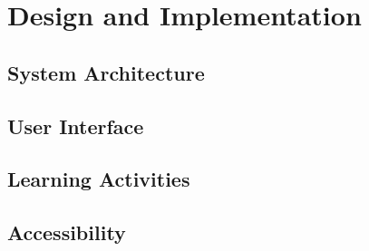 \chapter{Design and Implementation}

\section{System Architecture}

\section{User Interface}

\section{Learning Activities}

\section{Accessibility}
